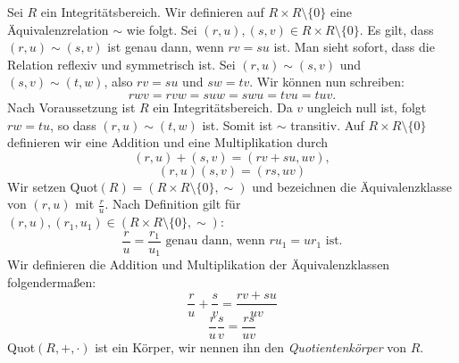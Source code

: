 
\begin{satz}\label{quotkoerper} %
Sei $R$ ein Integritätsbereich. Wir definieren auf $R\times R\setminus\lbrace 0\rbrace$ eine Äquivalenzrelation $\sim$ wie folgt. Sei $\left(r, u\right), \left(s, v\right) \in R\times R\setminus\lbrace 0\rbrace$. Es gilt, dass $\left(r,u\right) \sim \left(s, v\right)$ ist genau dann, wenn $rv = su$ ist. Man sieht sofort, dass die Relation reflexiv und symmetrisch ist. Sei $\left(r,u\right) \sim \left(s, v\right)$ und $ \left(s, v\right) \sim \left(t, w\right) $, also $rv = su$ und $sw = tv$. Wir können nun schreiben: \\
\[rwv = rvw = suw = swu = tvu = tuv.\]
Nach Voraussetzung ist $R$ ein Integritätsbereich. Da $v$ ungleich null ist, folgt $rw = tu$, so dass $\left(r,u \right) \sim \left(t, w\right)$ ist. Somit ist $\sim$ transitiv. Auf $R\times R\setminus \lbrace 0\rbrace$ definieren wir eine Addition und eine Multiplikation durch 
\[\left(r,u\right)+ \left(s,v\right) = \left(rv + su, uv\right),\]
\[\left(r,u\right)\left(s,v\right) = \left(rs, uv\right)\] 
Wir setzen \textup{Quot}$(R) = \left(R\times R\setminus\lbrace 0\rbrace , \sim\right)$ und bezeichnen die Äquivalenzklasse von $(r,u) $ mit $\frac{r}{u}$. Nach Definition gilt für $\left(r, u\right), \left(r_1, u_1\right) \in \left(R\times R\setminus\lbrace 0\rbrace , \sim\right)$:
\[ \frac{r}{u} = \frac{r_1}{u_1} \text{ genau dann, wenn } ru_1 = ur_1 \text{ ist.}
\]
Wir definieren die Addition und Multiplikation der Äquivalenzklassen folgendermaßen: 
\[\frac{r}{u} + \frac{s}{v} = \frac{rv + su}{uv}\]
\[\frac{r}{u}\frac{s}{v} = \frac{rs}{uv}\]
\textup{Quot}$\left(R, +, \cdot\right)$ ist ein Körper, wir nennen ihn den \textit{Quotientenkörper} von $R$.
\end{satz}
